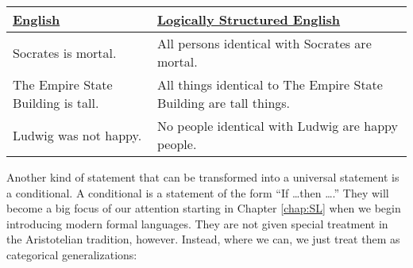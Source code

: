 \begin{table*}[!ht]
\begin{longtabu}{p{.5\linewidth}p{.5\linewidth}}
\underline{English} & \underline{Logically Structured English} \\
\endhead
Socrates is mortal. & All persons identical with Socrates are mortal. \\
The Empire State Building is tall. & All things identical to The Empire State Building are tall things. \\
Ludwig was not happy. & No people identical with Ludwig are happy people. \\

\end{longtabu}
\end{table*}


%
%
%
%
%
%
%

Another kind of statement that can be transformed into a universal statement is a conditional. A conditional is a statement of the form ``If \ldots then \ldots.'' They will become a big focus of our attention starting in Chapter \ref{chap:SL} when we begin introducing modern formal languages. They are not given special treatment in the Aristotelian tradition, however. Instead, where we can, we just treat them as categorical generalizations:


